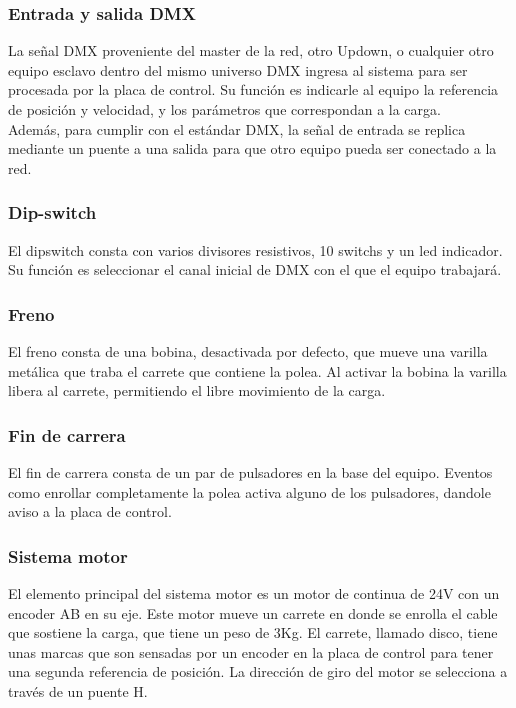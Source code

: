\subsubsection{Entrada y salida DMX}
La señal DMX proveniente del master de la red, otro Updown, o cualquier otro equipo esclavo dentro del mismo universo DMX ingresa al sistema para ser procesada por la placa de control. Su función es indicarle al equipo la referencia de posición y velocidad, y los parámetros que correspondan a la carga.\\
Además, para cumplir con el estándar DMX, la señal de entrada se replica mediante un puente a una salida para que otro equipo pueda ser conectado a la red.

\subsubsection{Dip-switch}
El dipswitch consta con varios divisores resistivos, 10 switchs y un led indicador. Su función es seleccionar el canal inicial de DMX con el que el equipo trabajará.

\subsubsection{Freno}
El freno consta de una bobina, desactivada por defecto, que mueve una varilla metálica que traba el carrete que contiene la polea. Al activar la bobina la varilla libera al carrete, permitiendo el libre movimiento de la carga.

\subsubsection{Fin de carrera}
El fin de carrera consta de un par de pulsadores en la base del equipo. Eventos como enrollar completamente la polea activa alguno de los pulsadores, dandole aviso a la placa de control.

\subsubsection{Sistema motor}
El elemento principal del sistema motor es un motor de continua de 24V con un encoder AB en su eje. Este motor mueve un carrete en donde se enrolla el cable que sostiene la carga, que tiene un peso de 3Kg. El carrete, llamado disco, tiene unas marcas que son sensadas por un encoder en la placa de control para tener una segunda referencia de posición. La dirección de giro del motor se selecciona a través de un puente H.

